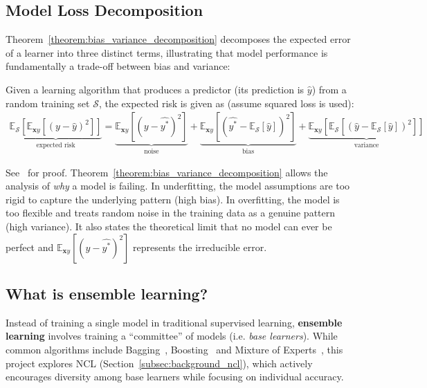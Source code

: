 \subsection{Model Loss Decomposition}
\label{subsec:background_model_loss_decomposition}
Theorem~\ref{theorem:bias_variance_decomposition} decomposes the expected error of a learner into three distinct terms, illustrating that model performance is fundamentally a trade-off between bias and variance: 
\begin{theorem}\label{theorem:bias_variance_decomposition}
    Given a learning algorithm that produces a predictor (its prediction is $\hat{y}$) from a random training set $\mathcal{S}$, the expected risk is given as (assume squared loss is used): 
    \begin{align*}
        \underbrace{\mathbb{E}_{\mathcal{S}}\left[\mathbb{E}_{\mathbf{x}y}\left[(y - \hat{y})^2\right]\right]}_{\text{expected risk}} = \underbrace{\mathbb{E}_{\mathbf{x}y}\left[(y - \hat{y^*})^2\right]}_{\text{noise}} + \underbrace{\mathbb{E}_{\mathbf{x}y}\left[\left(\hat{y^*} - \mathbb{E}_{\mathcal{S}}[\hat{y}]\right)^2\right]}_{\text{bias}} + \underbrace{\mathbb{E}_{\mathbf{x}y}\left[\mathbb{E}_{\mathcal{S}}\left[(\hat{y} - \mathbb{E}_{\mathcal{S}}[\hat{y}])^2\right]\right]}_{\text{variance}}
    \end{align*}
\end{theorem}
See~\cite{geman1992neural} for proof. Theorem~\ref{theorem:bias_variance_decomposition} allows the analysis of \textit{why} a model is failing. In underfitting, the model assumptions are too rigid to capture the underlying pattern (high bias). In overfitting, the model is too flexible and treats random noise in the training data as a genuine pattern (high variance). It also states the theoretical limit that no model can ever be perfect and $\mathbb{E}_{\mathbf{x}y}\left[(y - \hat{y^*})^2\right]$ represents the irreducible error. 


\subsection{What is ensemble learning? }
\label{subsec:background_ensemble_learning}
Instead of training a single model in traditional supervised learning, \textbf{ensemble learning} involves training a ``committee'' of models (i.e. \textit{base learners}). While common algorithms include Bagging~\cite{breiman1996bagging}, Boosting~\cite{freund1997decision} and Mixture of Experts~\cite{jacobs1991adaptive}, this project explores NCL (Section~\ref{subsec:background_ncl}), which actively encourages diversity among base learners while focusing on individual accuracy. 

